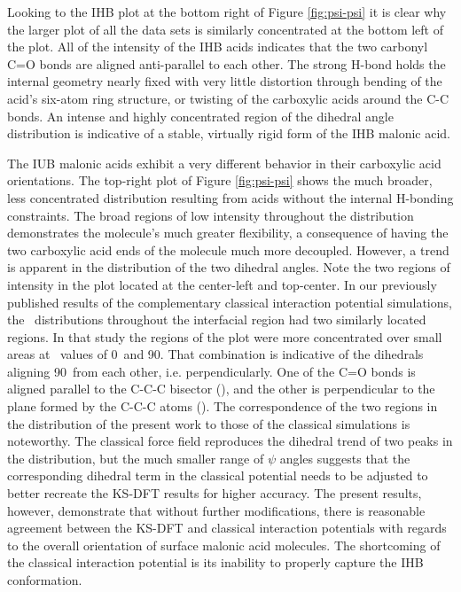 Looking to the IHB plot at the bottom right of Figure \ref{fig:psi-psi} it is clear why the larger plot of all the data sets is similarly concentrated at the bottom left of the plot. All of the intensity of the IHB acids indicates that the two carbonyl C=O bonds are aligned anti-parallel to each other. The strong H-bond holds the internal geometry nearly fixed with very little distortion through bending of the acid's six-atom ring structure, or twisting of the carboxylic acids around the C-C bonds. An intense and highly concentrated region of the dihedral angle distribution is indicative of a stable, virtually rigid form of the IHB malonic acid.

The IUB malonic acids exhibit a very different behavior in their carboxylic acid orientations. The top-right plot of Figure \ref{fig:psi-psi} shows the much broader, less concentrated distribution resulting from acids without the internal H-bonding constraints. The broad regions of low intensity throughout the distribution demonstrates the molecule's much greater flexibility, a consequence of having the two carboxylic acid ends of the molecule much more decoupled. However, a trend is apparent in the distribution of the two dihedral angles. Note the two regions of intensity in the plot located at the center-left and top-center. In our previously published results of the complementary classical interaction potential simulations,\cite{Blower2012} the \psipsi~distributions throughout the interfacial region had two similarly located regions. In that study the regions of the plot were more concentrated over small areas at \psipsi~values of 0\degr~and 90\degr. That combination is indicative of the dihedrals aligning 90\degr~from each other, i.e. perpendicularly. One of the C=O bonds is aligned parallel to the C-C-C bisector (\degr), and the other is perpendicular to the plane formed by the C-C-C atoms (\degr). The correspondence of the two regions in the distribution of the present work to those of the classical simulations is noteworthy. The classical force field reproduces the dihedral trend of two peaks in the distribution, but the much smaller range of $\psi$ angles suggests that the corresponding dihedral term in the classical potential needs to be adjusted to better recreate the KS-DFT results for higher accuracy. The present results, however, demonstrate that without further modifications, there is reasonable agreement between the KS-DFT and classical interaction potentials with regards to the overall orientation of surface malonic acid molecules. The shortcoming of the classical interaction potential is its inability to properly capture the IHB conformation.

